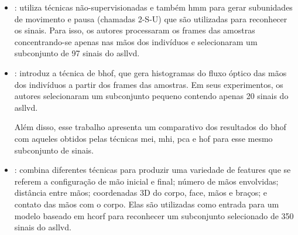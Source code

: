 \begin{itemize}

    \item \textbf{}: utiliza técnicas não-supervisionadas e também \acrfull{hmm} para gerar subunidades de movimento e pausa (chamadas 2-S-U) que são utilizadas para reconhecer os sinais.
          Para isso, os autores processaram os frames das amostras concentrando-se apenas nas mãos dos indivíduos e selecionaram um subconjunto de 97 sinais do \acrshort{asllvd}.

    \item \textbf{}: introduz a técnica de \acrfull{bhof}, que gera histogramas do fluxo óptico das mãos dos indivíduos a partir dos frames das amostras.
          Em seus experimentos, os autores selecionaram um subconjunto pequeno contendo apenas 20 sinais do \acrshort{asllvd}.

          Além disso, esse trabalho apresenta um comparativo dos resultados do \acrshort{bhof} com aqueles obtidos pelas técnicas \acrfull{mei}, \acrfull{mhi}, \acrfull{pca} e \acrfull{hof} para esse mesmo subconjunto de sinais.

    \item \textbf{}: combina diferentes técnicas para produzir uma variedade de features que se referem a configuração de mão inicial e final; número de mãos envolvidas; distância entre mãos; coordenadas 3D do corpo, face, mãos e braços; e contato das mãos com o corpo. Elas são utilizadas como entrada para um modelo baseado em \acrfull{hcorf} para reconhecer um subconjunto selecionado de 350 sinais do \acrshort{asllvd}.


\end{itemize}
